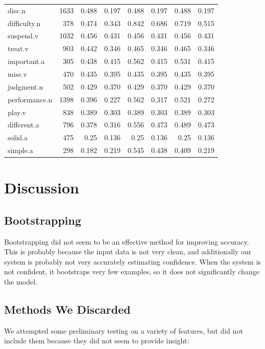 \documentclass{article}
\begin{document}
\begin{longtable}{l | r r r r r r r}
disc.n      	&	1633	&	0.488	&	0.197	&	0.488	&	0.197	&	0.488	&	0.197\\
difficulty.n	&	378 	&	0.474	&	0.343	&	0.842	&	0.686	&	0.719	&	0.515\\
suspend.v    	&	1032	&	0.456	&	0.431	&	0.456	&	0.431	&	0.456	&	0.431\\
treat.v        	&	903 	&	0.442	&	0.346	&	0.465	&	0.346	&	0.465	&	0.346\\
important.a    	&	305 	&	0.438	&	0.415	&	0.562	&	0.415	&	0.531	&	0.415\\
miss.v        	&	470 	&	0.435	&	0.395	&	0.435	&	0.395	&	0.435	&	0.395\\
judgment.n    	&	502 	&	0.429	&	0.370	&	0.429	&	0.370	&	0.429	&	0.370\\
performance.n	&	1398	&	0.396	&	0.227	&	0.562	&	0.317	&	0.521	&	0.272\\
play.v        	&	838 	&	0.389	&	0.303	&	0.389	&	0.303	&	0.389	&	0.303\\
different.a    	&	796 	&	0.378	&	0.316	&	0.556	&	0.473	&	0.489	&	0.473\\
solid.a        	&	475 	&	0.25	&	0.136	&	0.25	&	0.136	&	0.25	&	0.136\\
simple.a    	&	298 	&	0.182	&	0.219	&	0.545	&	0.438	&	0.409	&	0.219\\

\end{longtable}

\section{Discussion}

\subsection{Bootstrapping}

Bootstrapping did not seem to be an effective method for improving accuracy.  This is probably because the input data is not very clean, and additionally our system is probably not very accurately estimating confidence.  When the system is not confident, it bootstraps very few examples, so it does not significantly change the model.

\subsection{Methods We Discarded}

We attempted some preliminary testing on a variety of features, but did not include them because they did not seem to provide insight:
\end{document}
